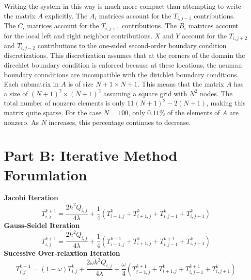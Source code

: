 \documentclass[reqno, 12pt]{amsart}
\begin{document}
    Writing the system in this way is much more compact than attempting to write the matrix $A$ explicitly.
    The $A_i$ matrices account for the $T_{i, j-1}$ contributions.
    The $C_i$ matrices account for  the $T_{i, j+1}$ contributions.
    The $B_i$ matrices account for the local left and right neighbor contributions.
    $X$ and $Y$ account for the $T_{i, j + 2}$ and $T_{i, j - 2}$ contributions to the one-sided second-order boundary condition discretizations.
    This discretization assumes that at the corners of the domain the direchlet boundary condition is enforced because at these locations, the neuman boundary connditions are incompatible with the dirichlet boundary conditions.
    Each submatrix in $A$ is of size $N + 1\times N + 1$.
    This means that the matrix $A$ has a size of $(N + 1)^2\times(N+1)^2$ assuming a square grid with $N^2$ nodes.
    The total number of nonzero elements is only $11(N+1)^2 - 2(N+1)$, making this matrix quite sparse.
    For the case $N = 100$, only $0.11\%$ of the elements of $A$ are nonzero.
    As $N$ increases, this percentage continues to decrease.

    \section{Part B: Iterative Method Forumlation}
    \noindent\textbf{Jacobi Iteration}
        \[T_{i,j}^{k+1} = \frac{2h^2Q_{i,j}}{4\lambda} +
        \frac{1}{4}\left(T_{i-1,j}^k + T_{i + 1, j}^k + T_{i,j-1}^k + T_{i, j+1}^k\right)\]
    \noindent\textbf{Gauss-Seidel Iteration}
        \[T_{i,j}^{k+1} = \frac{2h^2Q_{i,j}}{4\lambda} +
        \frac{1}{4}\left(T_{i-1,j}^{k+1} + T_{i + 1, j}^{k} + T_{i,j-1}^{k+1} + T_{i, j+1}^k\right)\]
    \noindent\textbf{Sucessive Over-relaxtion Iteration}
            \[T_{i,j}^{k+1} = (1-\omega)T_{i,j}^k + \frac{2\omega h^2Q_{i,j}}{4\lambda} +
        \frac{\omega}{4}\left(T_{i-1,j}^{k+1} + T_{i + 1, j}^{k} + T_{i,j-1}^{k+1} + T_{i, j+1}^k\right)\]
\end{document}
